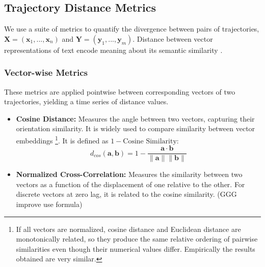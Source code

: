\documentclass[a4paper,12pt]{article}
\begin{document}
\subsection{Trajectory Distance Metrics}
We use a suite of metrics to quantify the divergence between pairs of trajectories, $\mathbf{X} = (\mathbf{x}_1, ..., \mathbf{x}_n)$ and $\mathbf{Y} = (\mathbf{y}_1, ..., \mathbf{y}_m)$. Distance between vector representations of text encode meaning about its semantic similarity \cite{text2vec} \cite{reimers2019sentencebertsentenceembeddingsusing} .

\subsubsection{Vector-wise Metrics}
These metrics are applied pointwise between corresponding vectors of two trajectories, yielding a time series of distance values.
\begin{itemize}
    \item \textbf{Cosine Distance:} Measures the angle between two vectors, capturing their orientation similarity. It is widely used to compare similarity between vector embeddings \footnote{If all vectors are normalized, cosine distance and Euclidean distance are monotonically related, so they produce the same relative ordering of pairwise similarities even though their numerical values differ. Empirically the results obtained are very similar.}. It is defined as $1 - \text{Cosine Similarity}$:
    \begin{equation}
        d_{cos}(\mathbf{a}, \mathbf{b}) = 1 - \frac{\mathbf{a} \cdot \mathbf{b}}{\|\mathbf{a}\| \|\mathbf{b}\|}
    \end{equation}
    \item \textbf{Normalized Cross-Correlation:} Measures the similarity between two vectors as a function of the displacement of one relative to the other. For discrete vectors at zero lag, it is related to the cosine similarity. (GGG improve use formula)
\end{itemize}
\end{document}
